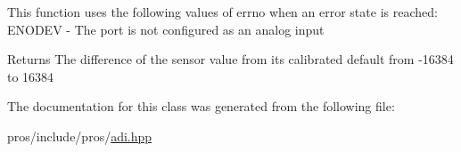 This function uses the following values of errno when an error state is reached\+: E\+N\+O\+D\+EV -\/ The port is not configured as an analog input

\begin{DoxyReturn}{Returns}
The difference of the sensor value from its calibrated default from -\/16384 to 16384 
\end{DoxyReturn}


The documentation for this class was generated from the following file\+:\begin{DoxyCompactItemize}
\item 
pros/include/pros/\hyperlink{adi_8hpp}{adi.\+hpp}\end{DoxyCompactItemize}
